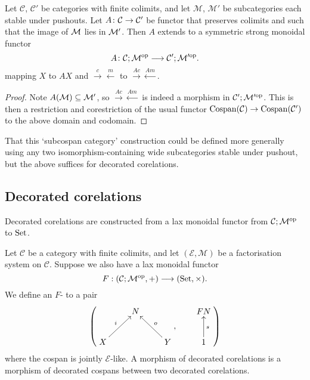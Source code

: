 \begin{lemma} \label{lem.madjointsfunctor}
  Let $\mathcal C$, $\mathcal C'$ be categories with finite colimits, and let
  $\mathcal M$, $\mathcal M'$ be subcategories each stable under pushouts. Let
  $A{\colon} \mathcal C \to \mathcal C'$ be functor that preserves colimits and such
  that the image of $\mathcal M$ lies in $\mathcal M'$. Then $A$ extends to a symmetric
  strong monoidal functor
  \[
    A{\colon} \mathcal C;\mathcal M^{\mathrm{op}} \longrightarrow \mathcal C'; \mathcal M'^{\mathrm{op}}.
  \]
  mapping $X$ to $AX$ and $\stackrel{c}\rightarrow \stackrel{m}\leftarrow$ to
  $\stackrel{Ac}\rightarrow \stackrel{Am}\leftarrow$.
\end{lemma}
\begin{proof}
  Note $A(\mathcal M) \subseteq \mathcal M'$, so $\stackrel{Ac}\rightarrow
  \stackrel{Am}\leftarrow$ is indeed a morphism in $\mathcal C';\mathcal M'^{\mathrm{op}}$. This is
  then a restriction and corestriction of the usual functor $\operatorname{{Cospan}}(\mathcal C) \to
  \operatorname{{Cospan}}(\mathcal C')$ to the above domain and codomain.
\end{proof}

That this `subcospan category' construction could be defined more
generally using any two isomorphism-containing wide subcategories stable under
pushout, but the above suffices for decorated corelations. 

\subsection{Decorated corelations}
Decorated corelations are constructed from a lax monoidal functor from $\mathcal
C;\mathcal M^{\mathrm{op}}$ to $\mathrm{Set}$.

\begin{definition}
  Let $\mathcal C$ be a category with finite colimits, and let $(\mathcal E,
  \mathcal M)$ be a factorisation system on $\mathcal C$. Suppose we also
  have a lax monoidal functor
  \[
    F: (\mathcal C;\mathcal M^{\mathrm{op}},+) \longrightarrow (\mathrm{Set}, \times).
  \]
  We define an $F$- to a pair
  \[
    \left(
    \begin{aligned}
      \xymatrix{
	& N \\  
	X \ar[ur]^{i} && Y \ar[ul]_{o}
      }
    \end{aligned}
    ,
    \qquad
    \begin{aligned}
      \xymatrix{
	FN \\
	1 \ar[u]_{s}
      }
    \end{aligned}
    \right)
  \]
  where the cospan is jointly $\mathcal E$-like. A morphism of decorated
  corelations is a morphism of decorated cospans between two decorated
  corelations.
\end{definition}

